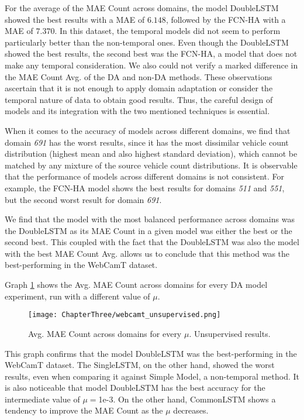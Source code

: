 For the average of the MAE Count across domains, the model DoubleLSTM showed the best results with a MAE of $6.148$, followed by the FCN-HA with a MAE of $7.370$. In this dataset, the temporal models did not seem to perform particularly better than the non-temporal ones. Even though the DoubleLSTM showed the best results, the second best was the FCN-HA, a model that does not make any temporal consideration. We also could not verify a marked difference in the MAE Count Avg. of the DA and non-DA methods. These observations ascertain that it is not enough to apply domain adaptation or consider the temporal nature of data to obtain good results. Thus, the careful design of models and its integration with the two mentioned techniques is essential. 

When it comes to the accuracy of models across different domains, we find that domain \textit{691} has the worst results, since it has the most dissimilar vehicle count distribution (highest mean and also highest standard deviation), which cannot be matched by any mixture of the source vehicle count distributions. It is observable that the performance of models across different domains is not consistent. For example, the FCN-HA model shows the best results for domains \textit{511} and \textit{551}, but the second worst result for domain \textit{691}. 

We find that the model with the most balanced performance across domains was the DoubleLSTM as its MAE Count in a given model was either the best or the second best. This coupled with the fact that the DoubleLSTM was also the model with the best MAE Count Avg. allows us to conclude that this method was the best-performing in the WebCamT dataset.

Graph \ref{fig:webcamt_unsupervised_graph} shows the Avg. MAE Count across domains for every DA model experiment, run with a different value of $\mu$.

\begin{figure}[!ht]
	\centering
	\texttt{[image: ChapterThree/webcamt\_unsupervised.png]}   
	\caption{Avg. MAE Count across domains for every $\mu$. Unsupervised results.}
	\label{fig:webcamt_unsupervised_graph}
\end{figure}

This graph confirms that the model DoubleLSTM was the best-performing in the WebCamT dataset. The SingleLSTM, on the other hand, showed the worst results, even when comparing it against Simple Model, a non-temporal method. It is also noticeable that model DoubleLSTM has the best accuracy for the intermediate value of $\mu=$1e-3. On the other hand, CommonLSTM shows a tendency to improve the MAE Count as the $\mu$ decreases.

